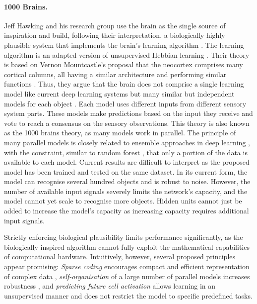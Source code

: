 \paragraph{1000 Brains.} Jeff Hawking and his research group use the brain as the single source of inspiration and build, following their interpretation, a biologically highly plausible system that implements the brain's learning algorithm \cite{hawkins_framework_2019}. The learning algorithm is an adapted version of unsupervised Hebbian learning \cite{hebb_organization_1949}. Their theory is based on Vernon Mountcastle's proposal that the neocortex comprises many cortical columns, all having a similar architecture and performing similar functions \cite{mountcastle_organizing_1978, mountcastle_columnar_1997}. Thus, they argue that the brain does not comprise a single learning model like current deep learning systems but many similar but independent models for each object \cite{lewis_locations_2019}. Each model uses different inputs from different sensory system parts. These models make predictions based on the input they receive and vote to reach a consensus on the sensory observations.
This theory is also known as the 1000 brains theory, as many models work in parallel. The principle of many parallel models is closely related to ensemble approaches in deep learning , with the constraint, similar to random forest , that only a portion of the data is available to each model. Current results are difficult to interpret as the proposed model has been trained and tested on the same dataset. In its current form, the model can recognise several hundred objects and is robust to noise. However, the number of available input signals severely limits the network's capacity, and the model cannot yet scale to recognise more objects.
Hidden units cannot just be added to increase the model's capacity as increasing capacity requires additional input signals.

Strictly enforcing biological plausibility limits performance significantly, as the biologically inspired algorithm cannot fully exploit the mathematical capabilities of computational hardware. Intuitively, however, several proposed principles appear promising: \emph{Sparse coding} encourages compact and efficient representation of complex data , \emph{self-organisation} of a large number of parallel models increases robustness \cite{yang_survey_2023}, and \emph{predicting future cell activation} allows learning in an unsupervised manner and does not restrict the model to specific predefined tasks.

